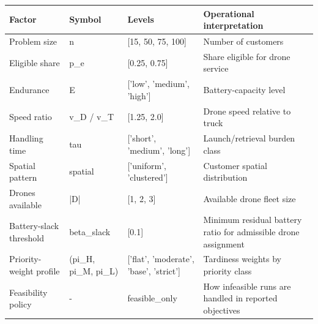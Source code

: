 \begin{tabular}{llll}
\toprule
Factor & Symbol & Levels & Operational interpretation \\
\midrule
Problem size & n & [15, 50, 75, 100] & Number of customers \\
Eligible share & p_e & [0.25, 0.75] & Share eligible for drone service \\
Endurance & E & ['low', 'medium', 'high'] & Battery-capacity level \\
Speed ratio & v_D / v_T & [1.25, 2.0] & Drone speed relative to truck \\
Handling time & tau & ['short', 'medium', 'long'] & Launch/retrieval burden class \\
Spatial pattern & spatial & ['uniform', 'clustered'] & Customer spatial distribution \\
Drones available & |D| & [1, 2, 3] & Available drone fleet size \\
Battery-slack threshold & beta_slack & [0.1] & Minimum residual battery ratio for admissible drone assignment \\
Priority-weight profile & (pi_H, pi_M, pi_L) & ['flat', 'moderate', 'base', 'strict'] & Tardiness weights by priority class \\
Feasibility policy & - & feasible_only & How infeasible runs are handled in reported objectives \\
\bottomrule
\end{tabular}
